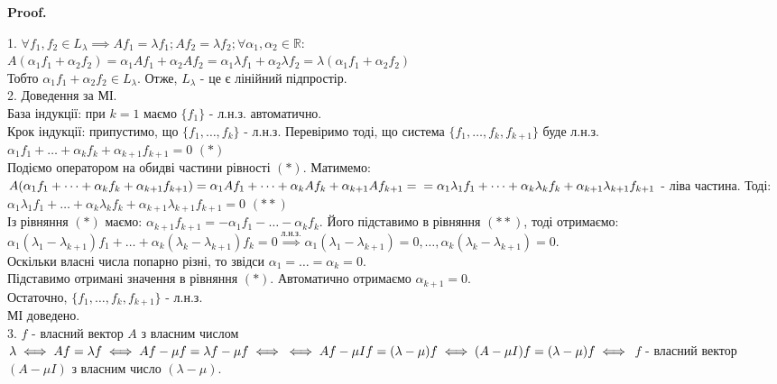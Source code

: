 \documentclass[a4paper, 10pt]{article}
\makeatletter
\theoremstyle{theoremdd}
\renewenvironment{proof}[1][Proof.\\]{\par
\pushQED{\hfill \qed}%
\normalfont \topsep6\p@\@plus6\p@\relax
\trivlist
\item\relax
{\bfseries
#1\@addpunct{.}}\hspace\labelsep\ignorespaces
}{%
\popQED\endtrivlist\@endpefalse
}
\makeatother
\begin{document}
\begin{proof}
1. $\forall f_1,f_2 \in L_{\lambda} \implies Af_1 = \lambda f_1; Af_2 = \lambda f_2; \forall \alpha_1, \alpha_2 \in \mathbb{R}:$\\
$A(\alpha_1 f_1 + \alpha_2 f_2) = \alpha_1 Af_1 + \alpha_2 Af_2 = \alpha_1 \lambda f_1 + \alpha_2 \lambda f_2 = \lambda (\alpha_1 f_1 + \alpha_2 f_2)$\\
Тобто $\alpha_1 f_1 + \alpha_2 f_2 \in L_{\lambda}$. Отже, $L_\lambda$ - це є лінійний підпростір.
\bigskip \\
2. Доведення за МІ.\\
База індукції: при $k=1$ маємо $\{f_1\}$ - л.н.з. автоматично.\\
Крок індукції: припустимо, що $\{f_1,\dots,f_k\}$ - л.н.з. Перевіримо тоді, що система $\{f_1,\dots,f_k, f_{k+1}\}$ буде л.н.з.\\
$\alpha_1 f_1 + \dots + \alpha_k f_k + \alpha_{k+1} f_{k+1} = 0$ $(*)$\\
Подіємо оператором на обидві частини рівності $(*)$. Матимемо:\\
$A(\alpha_1 f_1 + \dots + \alpha_k f_k + \alpha_{k+1} f_{k+1}) = \alpha_1 Af_1 + \dots + \alpha_k Af_k + \alpha_{k+1} Af_{k+1} = \\ = \alpha_1 \lambda_1 f_1 + \dots + \alpha_k \lambda_k f_k + \alpha_{k+1} \lambda_{k+1} f_{k+1}$ - ліва частина. Тоді:\\
$\alpha_1 \lambda_1 f_1 + \dots + \alpha_k \lambda_k f_k + \alpha_{k+1} \lambda_{k+1} f_{k+1} = 0$ $(**)$\\
Із рівняння $(*)$ маємо: $\alpha_{k+1}f_{k+1} = -\alpha_1 f_1 - \dots - \alpha_k f_k$. Його підставимо в рівняння $(**)$, тоді отримаємо:\\
$\alpha_1 (\lambda_1 - \lambda_{k+1})f_1 + \dots + \alpha_k (\lambda_k - \lambda_{k+1})f_k = 0 \overset{\textrm{л.н.з.}}{\implies} \alpha_1(\lambda_1 - \lambda_{k+1})=0, \dots, \alpha_k(\lambda_k - \lambda_{k+1}) = 0$.\\
Оскільки власні числа попарно різні, то звідси $\alpha_1 = \dots = \alpha_k = 0$.\\
Підставимо отримані значення в рівняння $(*)$. Автоматично отримаємо $\alpha_{k+1} = 0$.\\
Остаточно, $\{f_1,\dots,f_k, f_{k+1}\}$ - л.н.з.\\
МІ доведено.
\bigskip \\
3. $f$ - власний вектор $A$ з власним числом $\lambda \iff Af = \lambda f \iff Af - \mu f = \lambda f - \mu f \iff \\ \iff Af - \mu If = (\lambda - \mu)f \iff (A-\mu I)f = (\lambda - \mu)f \iff$ $f$ - власний вектор $(A- \mu I)$ з власним число $(\lambda - \mu)$.

\end{proof}
\end{document}
